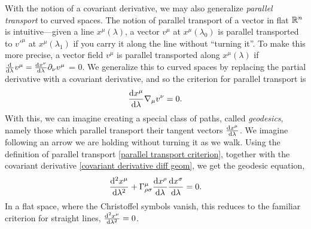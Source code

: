 %
With the notion of a covariant derivative, we may also generalize \emph{parallel transport} to curved spaces.
The notion of parallel transport of a vector in flat $\mathbb{R}^n$ is intuitive---given a line $x^\mu(\lambda)$, a vector $v^\mu$ at $x^\mu(\lambda_0)$ is parallel transported to $v'^\mu$ at $x^\mu(\lambda_1)$ if you carry it along the line without ``turning it''.
To make this more precise, a vector field $v^\mu$ is parallel transported along $x^\mu(\lambda)$ if $\odv{}{\lambda} v^\mu = \odv{x^\nu}{\lambda} \partial_\nu v^\mu$ = 0.
We generalize this to curved spaces by replacing the partial derivative with a covariant derivative, and so the criterion for parallel transport is
%
\begin{equation}
    \label{parallel transport criterion}
    \odv{x^\mu}{\lambda} \nabla_\mu v^\nu = 0.
\end{equation}
%
With this, we can imagine creating a special class of paths, called \emph{geodesics}, namely those which parallel transport their tangent vectors $\odv{x^\mu}{\lambda}$.
We imagine following an arrow we are holding without turning it as we walk.
Using the definition of parallel transport \autoref{parallel transport criterion}, together with the covariant derivative \autoref{covariant derivative diff geom}, we get the geodesic equation,
%
\begin{equation}
    \label{goedesic equation}
    \odv[2]{x^\mu}{\lambda} 
    + \Gamma^\mu_{\rho \sigma} \odv{x^\rho}{\lambda} \odv{x^\sigma}{\lambda}
    = 0.
\end{equation}
In a flat space, where the Christoffel symbols vanish, this reduces to the familiar criterion for straight lines, $\odv[2]{x^\mu}{\lambda} = 0$.

